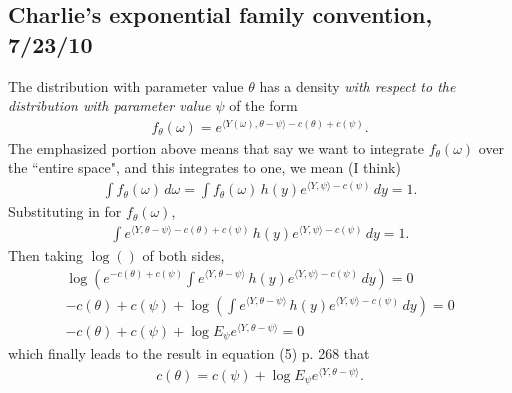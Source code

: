 \documentclass{amsbook}
\newcommand{\inner}[1]{\langle #1 \rangle}
\theoremstyle{definition}
\theoremstyle{remark}
\begin{document}
\subsection{Charlie's exponential family convention, 7/23/10}
The distribution with parameter value $\theta$ has a density \emph{with respect to 
the distribution with parameter value $\psi$} of the form
\begin{align*}
	f_\theta(\omega) = e^{ \inner{ Y(\omega), \theta - \psi } - c(\theta) + c(\psi)}.
\end{align*}
The emphasized portion above means that say we want to integrate $f_\theta(\omega)$ 
over the ``entire space", and this integrates to one, we mean (I think)
\begin{align*}
	\int f_\theta(\omega) \, d\omega = \int f_\theta(\omega) \, h(y) e^{ \inner{Y,
\psi} - c(\psi) } \, dy = 1.
\end{align*}
Substituting in for $f_\theta(\omega)$,
\begin{align*}
	\int  e^{ \inner{Y,\theta - \psi} - c(\theta) + c(\psi) }  \, h(y) e^{ \inner{Y,
\psi} - c(\psi) } \, dy = 1.
\end{align*}
Then taking $\log()$ of both sides,
\begin{align*}
	\log \left ( e^{ - c(\theta) + c(\psi) } \int  e^{ \inner{Y,\theta - \psi}}  \, h
(y) e^{ \inner{Y,\psi} - c(\psi) } \, dy \right ) = 0 \\
	  - c(\theta) + c(\psi) + \log \left ( \int  e^{ \inner{Y,\theta - \psi}}  \, h
(y) e^{ \inner{Y,\psi} - c(\psi) } \, dy \right ) = 0 \\
	  - c(\theta) + c(\psi) + \log E_\psi e^{ \inner{Y,\theta - \psi}} = 0 
\end{align*}
which finally leads to the result in equation (5) p. 268 that
\begin{align*}
	  c(\theta) = c(\psi) + \log E_\psi e^{ \inner{Y,\theta - \psi}}.
\end{align*}
\end{document}
